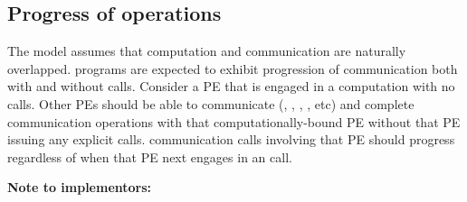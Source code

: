 
\subsection{Progress of \openshmem operations}
\label{subsec:progress}
The \openshmem model assumes that computation and communication are naturally overlapped. \openshmem programs are expected to exhibit progression of communication both with and without \openshmem calls. Consider a \ac{PE} that is engaged in a computation with no \openshmem calls. Other \ac{PE}s should be able to communicate (, , , , etc) and complete communication operations with that computationally-bound \ac{PE} without that \ac{PE} issuing any explicit \openshmem calls. \openshmem communication calls involving that \ac{PE} should progress regardless of when that \ac{PE} next engages in an \openshmem call.

\textbf{Note to implementors:}

